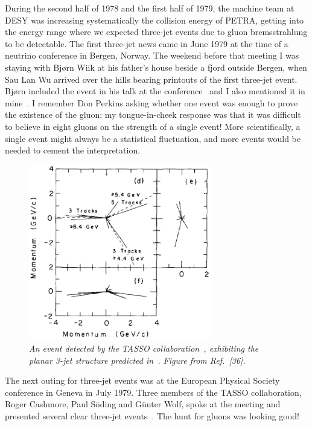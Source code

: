 \documentclass[12pt]{article} %
\begin{document}
During the second half of 1978 and the first half of 1979, the machine team at DESY was
increasing systematically the collision energy of PETRA, getting into the energy range where
we expected three-jet events due to gluon bremsstrahlung to be detectable.
The first three-jet news came in June 1979 at the time of a neutrino conference in Bergen, Norway. 
The weekend before that meeting I was staying with Bj{\o}rn Wiik at his father's house beside a fjord
outside Bergen, when Sau Lan Wu arrived over the hills bearing printouts of the first three-jet event. 
Bj{\o}rn included the event in his talk at the conference~\cite{BW} and I also mentioned it in mine~\cite{JEB}. 
I remember Don Perkins asking whether one event was enough to prove the existence of the gluon:
my tongue-in-cheek response was that it was difficult to believe in eight gluons on the strength of a single event!
More scientifically, a single event might always be a statistical fluctuation, and more events would
be needed to cement the interpretation.

\begin{figure}[htb]
\centerline{\includegraphics[width=8cm]{3jet.png}}
\caption{\it An event detected by the TASSO collaboration~\protect\cite{BW,TASSO},
exhibiting the planar 3-jet structure predicted in~\protect\cite{EGR}. Figure from Ref.~[36].} \label{3jet}
\end{figure}

The next outing for three-jet events was at the European Physical Society conference in Geneva in July 1979.
Three members of the TASSO collaboration, Roger Cashmore, Paul S{\"o}ding and G{\" u}nter Wolf,
spoke at the meeting and presented several clear three-jet events~\cite{TASSO}. The hunt for gluons was looking good!
\end{document}
